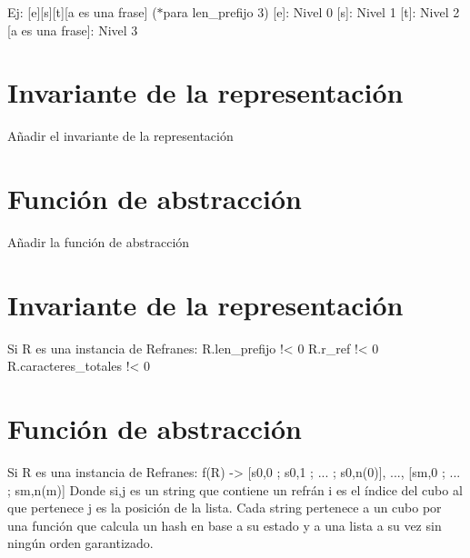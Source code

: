 Ej\+: \mbox{[}e\mbox{]}\mbox{[}s\mbox{]}\mbox{[}t\mbox{]}\mbox{[}a es una frase\mbox{]} ($\ast$para len\+\_\+prefijo 3) \mbox{[}e\mbox{]}\+: Nivel 0 \mbox{[}s\mbox{]}\+: Nivel 1 \mbox{[}t\mbox{]}\+: Nivel 2 \mbox{[}a es una frase\mbox{]}\+: Nivel 3\hypertarget{repRefranes_invRefranes}{}\section{Invariante de la representación}\label{repRefranes_invRefranes}
Añadir el invariante de la representación\hypertarget{repRefranes_faRefranes}{}\section{Función de abstracción}\label{repRefranes_faRefranes}
Añadir la función de abstracción\hypertarget{repRefranes_invRefranes}{}\section{Invariante de la representación}\label{repRefranes_invRefranes}
\begin{DoxyVerb}Si R es una instancia de Refranes:
  R.len_prefijo !< 0
  R.r_ref !< 0
  R.caracteres_totales !< 0
\end{DoxyVerb}
\hypertarget{repRefranes_faRefranes}{}\section{Función de abstracción}\label{repRefranes_faRefranes}
\begin{DoxyVerb}Si R es una instancia de Refranes:
  f(R) ->
    {[s0,0 ; s0,1 ; ... ; s0,n(0)],
      ...,
      [sm,0 ; ... ; sm,n(m)]}
Donde si,j es un string que contiene un refrán
i es el índice del cubo al que pertenece
j es la posición de la lista.
Cada string pertenece a un cubo por una función
que calcula un hash en base a su estado y a una
lista a su vez sin ningún orden garantizado.\end{DoxyVerb}
 